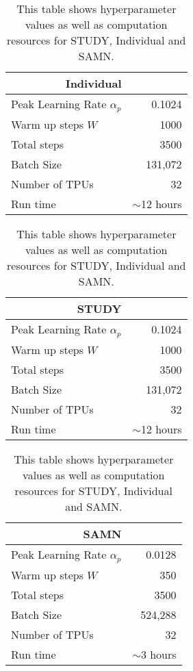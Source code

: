 \documentclass{article}
\begin{document}
\begin{table}[h]

 \begin{subtable}[t]{\pageSplitL\linewidth}
   \captionsetup{width=\captionwidthr\linewidth}
    \begin{tabular}{lr}
      \toprule
      \multicolumn{1}{r}{\bf Individual} & \\
      \midrule
      Peak Learning Rate $\alpha_p$  & 0.1024\\
      Warm up steps $W$ & 1000 \\
      Total steps & 3500 \\
      Batch Size & 131,072 \\
      Number of TPUs & 32 \\
      Run time & $\sim$12 hours \\
      \bottomrule
\end{tabular}


\begin{tabular}{lr}
      \toprule
      \multicolumn{1}{r}{\bf STUDY} &  \\
      \midrule
      Peak Learning Rate $\alpha_p$  & 0.1024\\
    Warm up steps $W$ & 1000 \\
      Total steps & 3500 \\
      Batch Size & 131,072 \\
      Number of TPUs & 32 \\
      Run time & $\sim$12 hours \\
      \bottomrule
\end{tabular}
\end{subtable}%
\begin{subtable}[t]{\pageSplitR\linewidth}
\captionsetup{width=\captionwidthr\linewidth}
  
     \begin{tabular}{lr}
      \toprule
      \multicolumn{1}{r}{\bf SAMN} & \\
      \midrule
      Peak Learning Rate $\alpha_p$  & 0.0128\\
      Warm up steps $W$ & 350 \\
      Total steps & 3500 \\
      Batch Size & 524,288 \\
      Number of TPUs & 32 \\
      Run time & $\sim$3 hours \\
      \bottomrule
\end{tabular}
\end{subtable}

\caption{This table shows hyperparameter values as well as computation resources for STUDY, Individual and SAMN.}
\label{table:hyperparams}
\end{table}
\clearpage
\end{document}
